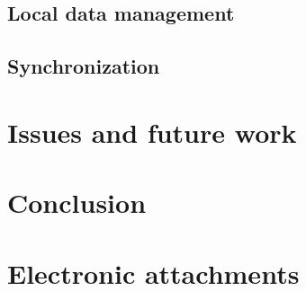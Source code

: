 \documentclass[
  digital,     %
  color,       %
  oneside,     %
  nosansbold,  %
  nocolorbold, %
  lof,         %
  lot,         %
]{fithesis4}
\begin{document}
\section{Local data management}
\section{Synchronization}

\chapter{Issues and future work}

\chapter*{Conclusion}

\setcounter{biburllcpenalty}{7000}
\setcounter{biburlucpenalty}{8000}
\printbibliography[heading=bibintoc] %

\appendix %
\chapter{Electronic attachments}
\end{document}
